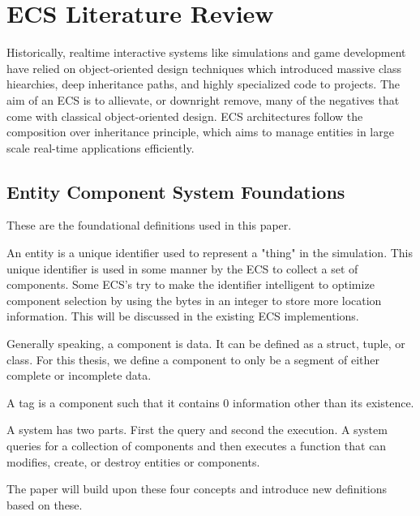 \section{ECS Literature Review}
\label{chap:1}

Historically, realtime interactive systems like simulations and game development have relied on object-oriented design techniques which introduced massive class hiearchies, deep inheritance paths, and highly specialized code to projects. The aim of an ECS is to allievate, or downright remove, many of the negatives that come with classical object-oriented design. ECS architectures follow the composition over inheritance principle, which aims to manage entities in large scale real-time applications efficiently. \cite{Haerkoenen2019} 

\subsection{Entity Component System Foundations}
These are the foundational definitions used in this paper.

\begin{tdefn}[Entity]
    An entity is a unique identifier used to represent a "thing" in the simulation. This unique identifier is used in some manner by the ECS to collect a set of components. Some ECS's try to make the identifier intelligent to optimize component selection by using the bytes in an integer to store more location information. This will be discussed in the existing ECS implementions.
\end{tdefn}
\begin{tdefn}[Component]
    Generally speaking, a component is data. It can be defined as a struct, tuple, or class. For this thesis, we define a component to only be a segment of either complete or incomplete data.
\end{tdefn}
\begin{tdefn}[Tag]
    A tag is a component such that it contains 0 information other than its existence.
\end{tdefn}
\begin{tdefn}[System]
    A system has two parts. First the query and second the execution. A system queries for a collection of components and then executes a function that can modifies, create, or destroy entities or components.
\end{tdefn}
\noindent The paper will build upon these four concepts and introduce new definitions based on these.

